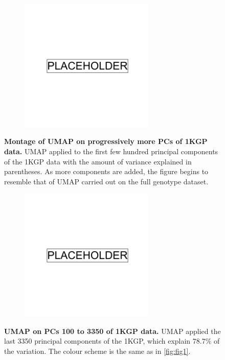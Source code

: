 \begin{figure}
    \centering
    \begin{subfigure}{0.95\textwidth}
    \includegraphics[width=0.7\textwidth]{placeholder.png}
    \end{subfigure}
    \caption[Montage of UMAP on progressively more PCs of 1KGP data]{\textbf{Montage of UMAP on progressively more PCs of 1KGP data.} UMAP applied to the first few hundred principal components of the 1KGP data with the amount of variance explained in parentheses. As more components are added, the figure begins to resemble that of UMAP carried out on the full genotype dataset.}
    \label{fig:supp_montage_1kgp_converge}
\end{figure}

\newpage

\begin{figure}
    \centering
    \begin{subfigure}{0.95\textwidth}
    \includegraphics[width=0.7\textwidth]{placeholder.png}
    \end{subfigure}
    \caption[UMAP on PCs 100 to 3350 of 1KGP data]{\textbf{UMAP on PCs 100 to 3350 of 1KGP data.} UMAP applied the last 3350 principal components of the 1KGP, which explain 78.7\% of the variation. The colour scheme is the same as in \ref{fig:fig1}.}
    \label{fig:supp_1kgp_3350}
\end{figure}

